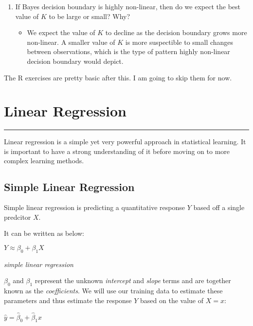 \documentclass[]{book}
\providecommand{\tightlist}{%
  \setlength{\itemsep}{0pt}\setlength{\parskip}{0pt}}
\theoremstyle{definition}
\theoremstyle{definition}
\theoremstyle{definition}
\theoremstyle{remark}
\begin{document}
\begin{enumerate}
\def\labelenumi{(\alph{enumi})}
\setcounter{enumi}{3}
\tightlist
\item
  If Bayes decision boundary is highly non-linear, then do we expect the
  best value of \(K\) to be large or small? Why?

  \begin{itemize}
  \tightlist
  \item
    We expect the value of \(K\) to decline as the decision boundary
    grows more non-linear. A smaller value of \(K\) is more suspectible
    to small changes between observations, which is the type of pattern
    highly non-linear decision boundary would depict.
  \end{itemize}
\end{enumerate}

The R exercises are pretty basic after this. I am going to skip them for
now.

\chapter{Linear Regression}\label{linear-regression}

\begin{center}\rule{0.5\linewidth}{\linethickness}\end{center}

Linear regression is a simple yet very powerful approach in statistical
learning. It is important to have a strong understanding of it before
moving on to more complex learning methods.

\section{Simple Linear Regression}\label{simple-linear-regression}

Simple linear regression is predicting a quantitative response \(Y\)
based off a single predcitor \(X\).

It can be written as below:

\(Y \approx \beta_0 + \beta_1X\)

\emph{simple linear regression}

\(\beta_0\) and \(\beta_1\) represent the unknown \emph{intercept} and
\emph{slope} terms and are together known as the \emph{coefficients}. We
will use our training data to estimate these parameters and thus
estimate the response \(Y\) based on the value of \(X = x\):

\(\hat y = \hat\beta_0 + \hat\beta_1x\)
\end{document}
